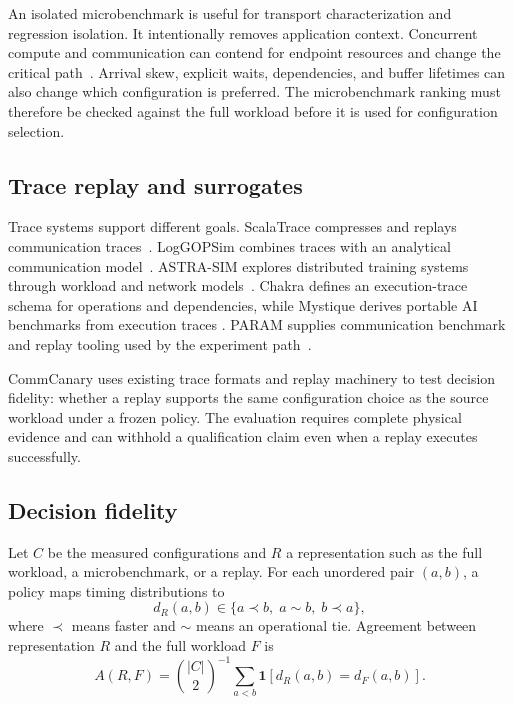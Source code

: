 \documentclass[10pt,twocolumn]{article}
\begin{document}
An isolated microbenchmark is useful for transport characterization and
regression isolation. It intentionally removes application context. Concurrent
compute and communication can contend for endpoint resources and change the
critical path~\cite{overlap}. Arrival skew, explicit waits, dependencies, and
buffer lifetimes can also change which configuration is preferred. The
microbenchmark ranking must therefore be checked against the full workload
before it is used for configuration selection.

\subsection{Trace replay and surrogates}

Trace systems support different goals. ScalaTrace compresses and replays
communication traces~\cite{scalatrace}. LogGOPSim combines traces with an
analytical communication model~\cite{loggopsim}. ASTRA-SIM explores distributed
training systems through workload and network models~\cite{astrasim,astrasim2}.
Chakra defines an execution-trace schema for operations and dependencies,
while Mystique derives portable AI benchmarks from execution traces
\cite{chakra,mystique}. PARAM supplies communication benchmark and replay
tooling used by the experiment path~\cite{param}.

CommCanary uses existing trace formats and replay machinery to test decision
fidelity: whether a replay supports the same configuration choice as the source
workload under a frozen policy. The evaluation requires complete physical
evidence and can withhold a qualification claim even when a replay executes
successfully.

\subsection{Decision fidelity}
\label{sec:fidelity}

Let $C$ be the measured configurations and $R$ a representation such as the
full workload, a microbenchmark, or a replay. For each unordered pair $(a,b)$,
a policy maps timing distributions to
\begin{equation}
  d_R(a,b) \in \{a \prec b,\; a \sim b,\; b \prec a\},
\end{equation}
where $\prec$ means faster and $\sim$ means an operational tie. Agreement
between representation $R$ and the full workload $F$ is
\begin{equation}
  A(R,F)=\binom{|C|}{2}^{-1}\sum_{a<b}
  \mathbf{1}[d_R(a,b)=d_F(a,b)].
\end{equation}
\end{document}
